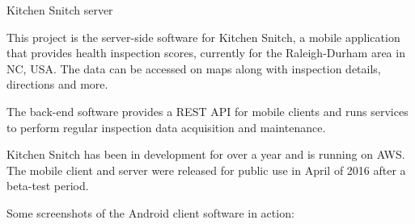 \documentclass[DIV16,twocolumn,10pt]{scrreprt}
\begin{document}
\begin{hcarentry}{Kitchen Snitch server}
\makeheader

This project is the server-side software for Kitchen Snitch, a mobile application that provides health inspection scores, currently for the Raleigh-Durham area in NC, USA. The data can be accessed on maps along with inspection details, directions and more.

\vspace{5mm}

The back-end software provides a REST API for mobile clients and runs services to perform regular inspection data acquisition and maintenance.

\vspace{5mm}

Kitchen Snitch has been in development for over a year and is running on AWS. The mobile client and server were released for public use in April of 2016 after a beta-test period.

\vspace{5mm}

Some screenshots of the Android client software in action:


\end{hcarentry}
\end{document}
